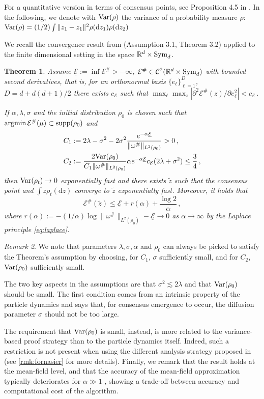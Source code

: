 \documentclass{article}
\theoremstyle{plain}
\newtheorem{theorem}{Theorem}[section]
\theoremstyle{definition}
\theoremstyle{remark}
\newtheorem{remark}[theorem]{Remark}
\newcommand{\Rd}{ {\mathbb{R}^d}}
\newcommand{\E}{\mathcal{E}}
\newcommand{\var}{\textup{Var}}
\renewcommand{\d}{\mathrm{d}}
\newcommand{\supp}{\textup{supp}}
\newcommand{\argmin}{\textup{argmin}}
\newcommand{\sym}{\textup{Sym}_d}
\newcommand{\rev}{}
\begin{document}
For a quantitative version in terms of consensus points, see Proposition 4.5 in \citep{fornasier2024consensusbased}.  In the following, we denote with $\var(\rho)$ the variance of a probability measure $\rho$: $\var(\rho) = (1/2)\int\| z_1 - z_1\|^2 \rho(\d z_1)\rho(\d z_2)$

We recall the convergence result from \citep{carrillo2021consensus} (Assumption 3.1, Theorem 3.2) applied to the finite dimensional setting in the space $\Rd\times \sym$.

\begin{theorem} \label{t:convergence} Assume $\underline{\E} := \inf \E^\# > -\infty$, $\E^\#\in \mathcal{C}^2(\Rd\times \sym)$ with bounded second derivatives, that is, for an orthonormal basis $\{e_\ell\}_{\ell = 1}^{D}$, $D = d + d(d+1)/2$ there exists $c_\E$ such that  $\max _\ell \max_{z}\left | \partial^2 \E^{\#}(z)/\partial e_\ell^2 \right| < c_\E\,.$


If $\alpha, \lambda, \sigma$ and the initial distribution $\rho_0$ is chosen such that $\argmin\,\E^\#(\mu) \subset \supp(\rho_0)$ and
\begin{align*}
C_1 &:= 2\lambda - \sigma^2 - 2\sigma^2 \frac{e^{-\alpha \underline{\E}}}{\| \omega^\#\|_{L^2(\rho_0)}} > 0\,, \\
C_2&:= \frac{2 \var(\rho_0)} {C_1 \| \omega^\#\|_{L^2(\rho_0)}} \alpha e^{-\alpha \underline{\E} } c_\E (2\lambda + \sigma^2) \leq \frac34\,,
\end{align*}
then $\var(\rho_t) \to 0$ exponentially fast and there exists $\tilde z$ such that the consensus point and $\int z \rho_t(\d z)$ converge to $\tilde z$ exponentially fast.
Moreover, it holds that 
\[
\E^\#(\tilde z) \leq \underline{\E}+ r(\alpha)  + \frac{\log 2}\alpha\,,
\]
where $r(\alpha):= - (1/\alpha) \log \| \omega^{\#}\|_{L^2(\rho_0)} - \underline{\E} \to 0$ as $\alpha \to \infty$ by the Laplace principle \eqref{eq:laplace}.
\end{theorem} 

\begin{remark}
We note that parameters $\lambda, \sigma, \alpha$ and $\rho_0$ can always be picked to satisfy the Theorem's assumption by choosing, for $C_1$, $\sigma$ sufficiently small, and for $C_2$, $\var(\rho_0)$ sufficiently small.
    \rev{The two key aspects in the assumptions are that $\sigma^2\lesssim 2\lambda$ and that $\textup{Var}(\rho_0)$ should be small. The first condition comes from an intrinsic property of the particle dynamics and says that, for consensus emergence to occur, the diffusion parameter $\sigma$ should not be too large.
   
    The requirement that $\textup{Var}(\rho_0)$ is small, instead, is more related to the variance-based proof strategy than to the particle dynamics itself. Indeed, such a restriction is not present when using the different analysis strategy proposed in \cite{fornasier2024consensusbased} (see \cref{rmk:fornasier} for more details). Finally, we remark that the result holds at the mean-field level, and that the accuracy of the mean-field approximation typically deteriorates for $\alpha \gg 1$ \cite{gerber2025uniform}, showing a trade-off between accuracy and computational cost of the algorithm. }
\end{remark}
\end{document}
